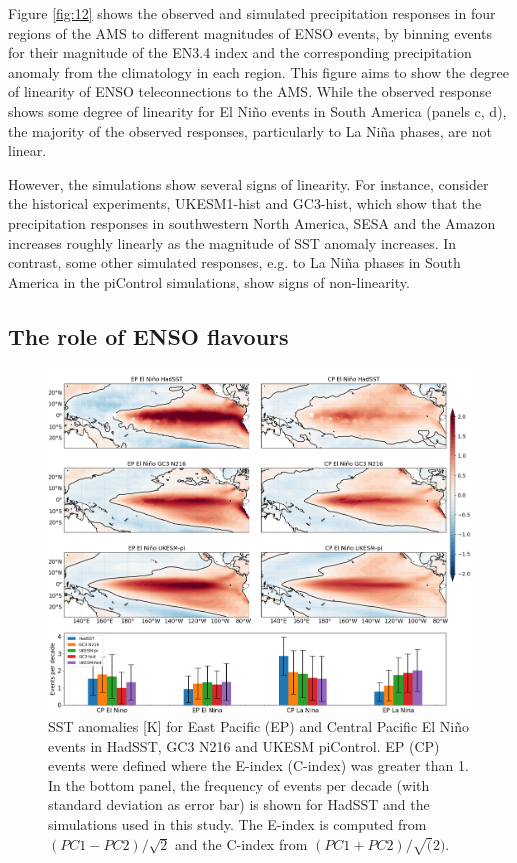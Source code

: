 




 Figure \ref{fig:12} shows the observed and simulated precipitation responses in four regions of the AMS to different magnitudes of ENSO events, by binning events for their magnitude of the EN3.4 index and the corresponding precipitation anomaly from the climatology in each region. This figure aims to show  the degree of linearity of ENSO teleconnections to the AMS.
While the observed response shows some degree of linearity for El Ni\~no events in South America (panels c, d), the majority of the observed responses, particularly to La Ni\~na phases, are not linear.

 However, the simulations show several signs of linearity. For instance, consider the historical experiments, UKESM1-hist and GC3-hist, which show that the precipitation responses in southwestern North America, SESA and the Amazon increases roughly linearly as the magnitude of SST anomaly increases. In contrast, some other simulated responses, e.g. to La Ni\~na phases in South America in the piControl simulations, show signs of non-linearity.



\subsection{The role of ENSO flavours}
  
\begin{figure}[b!]
\includegraphics[width=\linewidth]{figures/epcpmap}
\caption[Diversity of ENSO SST patterns]{SST anomalies [K] for East Pacific (EP) and Central Pacific El Niño events in HadSST, GC3 N216 and UKESM piControl. EP (CP) events were defined where the E-index (C-index) was greater than 1. In the bottom panel, the frequency of events per decade (with standard deviation as error bar) is shown for HadSST and the simulations used in this study.
The E-index is computed from $(PC1-PC2)/\sqrt{2}$ and the C-index from $(PC1+PC2)/\sqrt(2)$.
}
\label{fig:s1}
\end{figure}


